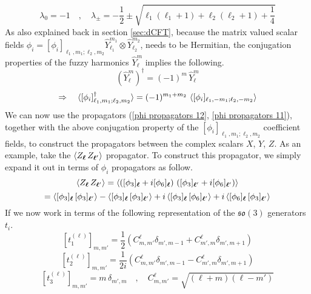 %
%
\begin{equation}
\lambda_0 = -1
%
\quad , \quad
%
\lambda_{\pm}
=
-\frac{1}{2} \pm \sqrt{\ell_1 (\ell_1 + 1) + \ell_2 (\ell_2 + 1) + \frac{1}{4}}
\end{equation}
%
%
As also explained back in section \ref{sec:dCFT}, because the matrix valued scalar fields $\phi_i = [\phi_i]_{\ell_1,m_1;\ell_2,m_2} \hat{Y}^{m_1}_{\ell_1} \otimes \hat{Y}^{m_2}_{\ell_2}$, needs to be Hermitian, the conjugation properties of the fuzzy harmonics $\hat{Y}^{m}_{\ell}$ implies the following.
%
%
\begin{equation*}
(\hat{Y}^{m}_{\ell})^\dagger
=
(-1)^m \, \hat{Y}^{m}_{\ell}
\end{equation*}
%
%
\begin{equation}
\Rightarrow \quad
%
\langle [\phi_i]_{\ell_1,m_1;\ell_2,m_2}^\dagger \rangle
=
(-1)^{m_1 + m_2} \, \expval{[\phi_i]_{\ell_1,-m_1;\ell_2,-m_2}}
\end{equation}
%
%
We can now use the propagators (\ref{phi propagators 12}, \ref{phi propagators 11}), together with the above conjugation property of the $[\phi_i]_{\ell_1,m_1;\ell_2,m_2}$ coefficient fields, to construct the propagators between the complex scalars $X$, $Y$, $Z$. As an example, take the $\expval{Z_{\boldsymbol{\ell}} \, Z_{\boldsymbol{\ell}'}}$ propagator. To construct this propagator, we simply expand it out in terms of $\phi_i$ propagators as follow.
%
%
\begin{equation*}
\expval{Z_{\boldsymbol{\ell}} \, Z_{\boldsymbol{\ell}'}}
=
\expval{\left([\phi_3]_{\boldsymbol{\ell}} + i [\phi_6]_{\boldsymbol{\ell}} \right) \, \left([\phi_3]_{\boldsymbol{\ell}'} + i [\phi_6]_{\boldsymbol{\ell}'}\right)}
\end{equation*}
%
%
\begin{equation}\label{ZZ propagator expansion}
=
\expval{[\phi_3]_{\boldsymbol{\ell}} \, [\phi_3]_{\boldsymbol{\ell}'}}
-
\expval{[\phi_3]_{\boldsymbol{\ell}} \, [\phi_3]_{\boldsymbol{\ell}'}}
+
i \expval{[\phi_3]_{\boldsymbol{\ell}} \, [\phi_6]_{\boldsymbol{\ell}'}}
+
i \expval{[\phi_6]_{\boldsymbol{\ell}} \, [\phi_3]_{\boldsymbol{\ell}'}}
\end{equation}
%
%
If we now work in terms of the following representation of the $\mathfrak{so}(3)$ generators $t_i$.
%
%
\begin{equation}\label{t1 rep}
[t^{(\ell)}_1]_{m,m'}
=
\frac{1}{2} \left(
C^\ell_{m,m'} \delta_{m',m-1}
+ 
C^\ell_{m',m} \delta_{m',m+1}
\right)
\end{equation}
%
%
\begin{equation}\label{t2 rep}
[t^{(\ell)}_2]_{m,m'}
=
\frac{1}{2 i} \left(
C^\ell_{m,m'} \delta_{m',m-1}
- 
C^\ell_{m',m} \delta_{m',m+1}
\right)
\end{equation}
%
%
\begin{equation}\label{t3 rep}
[t^{(\ell)}_3]_{m,m'}
=
m \, \delta_{m',m}
%
\quad , \quad
%
C^\ell_{m,m'} = \sqrt{(\ell+m)(\ell-m')}
\end{equation}
%
%


